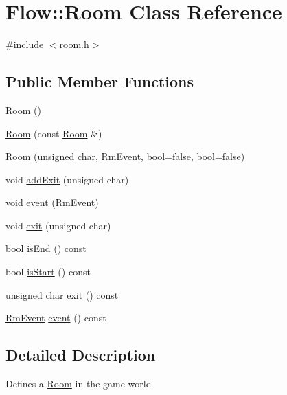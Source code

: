\hypertarget{class_flow_1_1_room}{}\section{Flow\+:\+:Room Class Reference}
\label{class_flow_1_1_room}


{\ttfamily \#include $<$room.\+h$>$}

\subsection*{Public Member Functions}
\begin{DoxyCompactItemize}
\item 
\hyperlink{class_flow_1_1_room_acbd4ea4683660ee3f5120b396e3d9e67}{Room} ()
\item 
\hyperlink{class_flow_1_1_room_ab9bb4be79ce8b04be3537a6fc308dad4}{Room} (const \hyperlink{class_flow_1_1_room}{Room} \&)
\item 
\hyperlink{class_flow_1_1_room_ab72d88a0660f8d836fc8edc18ded95dc}{Room} (unsigned char, \hyperlink{namespace_flow_a01e62c2d0a9c24924a2fce4b667dd9d8}{Rm\+Event}, bool=false, bool=false)
\item 
void \hyperlink{class_flow_1_1_room_ac6f5f04b58afe0002ced970c6068c503}{add\+Exit} (unsigned char)
\item 
void \hyperlink{class_flow_1_1_room_abf44d5659e88ff6cef74e5a95350d09d}{event} (\hyperlink{namespace_flow_a01e62c2d0a9c24924a2fce4b667dd9d8}{Rm\+Event})
\item 
void \hyperlink{class_flow_1_1_room_a67dabfa09fc6c04cf9706c6387083990}{exit} (unsigned char)
\item 
bool \hyperlink{class_flow_1_1_room_a2a41303b2f9856fd8d9f7fcf7feccab5}{is\+End} () const
\item 
bool \hyperlink{class_flow_1_1_room_ad5fe3a89b1a14b1619f920f624953ff6}{is\+Start} () const
\item 
unsigned char \hyperlink{class_flow_1_1_room_afddbff9ee70421d5df3dbbf202afe35f}{exit} () const
\item 
\hyperlink{namespace_flow_a01e62c2d0a9c24924a2fce4b667dd9d8}{Rm\+Event} \hyperlink{class_flow_1_1_room_a5f32585a64d31afb8add2d20eb884a85}{event} () const
\end{DoxyCompactItemize}


\subsection{Detailed Description}
Defines a \hyperlink{class_flow_1_1_room}{Room} in the game world 

